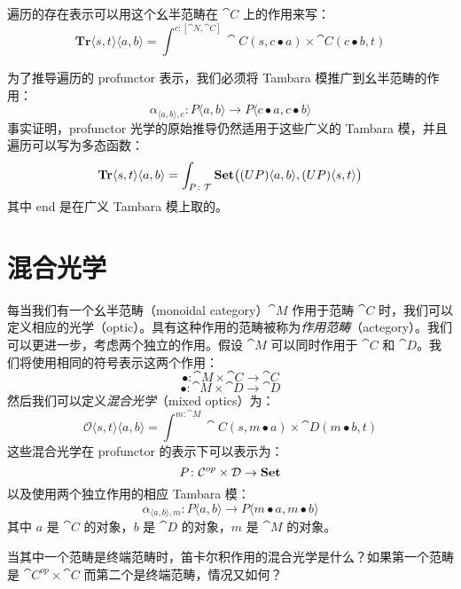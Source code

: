 \documentclass[DaoFP]{subfiles}
\begin{document}
遍历的存在表示可以用这个幺半范畴在 $\cat C$ 上的作用来写：
\[ \mathbf{Tr} \langle s, t\rangle \langle a, b \rangle = \int^{c \colon [\cat N, \cat C]} \cat C (s, c \bullet a) \times \cat C (c \bullet b, t) \]

为了推导遍历的 profunctor 表示，我们必须将 Tambara 模推广到幺半范畴的作用：
\[ \alpha_{\langle a, b\rangle, c} \colon P \langle a, b \rangle \to P \langle c \bullet a, c \bullet b \rangle \]
事实证明，profunctor 光学的原始推导仍然适用于这些广义的 Tambara 模，并且遍历可以写为多态函数：
\[  \mathbf{Tr}\langle s, t \rangle \langle a, b \rangle 
 =\int_{P \colon \mathcal{T}} \mathbf{Set} \big((U P) \langle a, b\rangle, (U P) \langle s, t\rangle \big) \]
其中 end 是在广义 Tambara 模上取的。

\section{混合光学}

每当我们有一个幺半范畴（monoidal category）$\cat M$ 作用于范畴 $\cat C$ 时，我们可以定义相应的光学（optic）。具有这种作用的范畴被称为\emph{作用范畴}（actegory）。我们可以更进一步，考虑两个独立的作用。假设 $\cat M$ 可以同时作用于 $\cat C$ 和 $\cat D$。我们将使用相同的符号表示这两个作用：
\[ \bullet \colon \cat M \times \cat C \to \cat C \]
\[ \bullet \colon \cat M \times \cat D \to \cat D \]
然后我们可以定义\emph{混合光学}（mixed optics）为：
\[ \mathcal{O} \langle s, t \rangle \langle a, b \rangle = \int^{m \colon \cat M} \cat C(s, m \bullet a) \times \cat D(m \bullet b, t) \]
这些混合光学在 profunctor 的表示下可以表示为：
\[ P \colon \mathcal{C} ^{op} \times \mathcal{D} \to \mathbf{Set} \]
以及使用两个独立作用的相应 Tambara 模：
\[ \alpha_{\langle a, b\rangle, m} \colon P \langle a, b \rangle \to P \langle m \bullet a, m \bullet b \rangle \]
其中 $a$ 是 $\cat C$ 的对象，$b$ 是 $\cat D$ 的对象，$m$ 是 $\cat M$ 的对象。

\begin{exercise}
当其中一个范畴是终端范畴时，笛卡尔积作用的混合光学是什么？如果第一个范畴是 $\cat C^{op} \times \cat C$ 而第二个是终端范畴，情况又如何？
\end{exercise}
\end{document}
